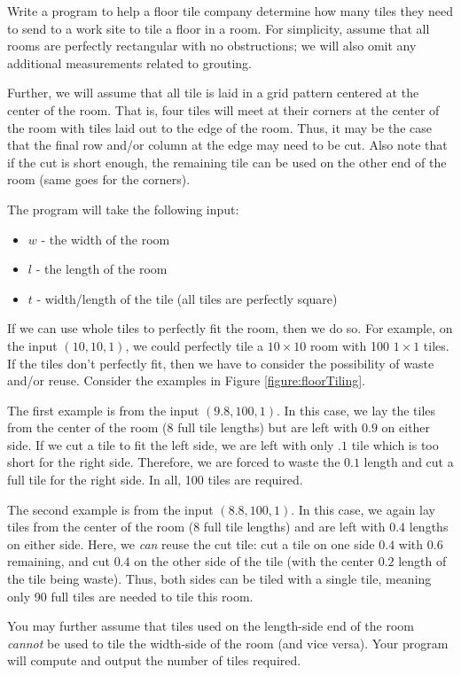 \begin{exer}
Write a program to  help a floor tile company determine how many
tiles they need to send to a work site to tile a floor in a room.  For 
simplicity, assume that all rooms are perfectly rectangular with no 
obstructions; we will also omit any additional measurements related 
to grouting.  

Further, we will assume that all tile is laid in a grid pattern centered 
at the center of the room.  That is, four tiles will meet at their corners 
at the center of the room with tiles laid out to the edge of the room.  
Thus, it may be the case that the final row and/or column at the edge 
may need to be cut.  Also note that if the cut is short enough, the 
remaining tile can be used on the other end of the room (same goes 
for the corners).

The program will take the following input:
\begin{itemize}
  \item $w$ - the width of the room
  \item $l$ - the length of the room
  \item $t$ - width/length of the tile (all tiles are perfectly square)
\end{itemize}

If we can use whole tiles to perfectly fit the room, then we do so.  
For example, on the input $(10, 10, 1)$, we could perfectly tile a 
$10 \times 10$ room with 100 $1 \times 1$ tiles.  If the tiles don't 
perfectly fit, then we have to consider the possibility of waste 
and/or reuse.  Consider the examples in Figure \ref{figure:floorTiling}.



The first example is from the input $(9.8, 100, 1)$.  In this case, 
we lay the tiles from the center of the room (8 full tile lengths) but 
are left with $0.9$ on either side.  If we cut a tile to fit the left
side, we are left with only $.1$ tile which is too short for the right 
side.  Therefore, we are forced to waste the $0.1$ length and cut 
a full tile for the right side.  In all, 100 tiles are required.

The second example is from the input $(8.8, 100, 1)$.  In this case, 
we again lay tiles from the center of the room (8 full tile lengths) and 
are left with $0.4$ lengths on either side.  Here, we \emph{can}
reuse the cut tile: cut a tile on one side $0.4$ with $0.6$ remaining, 
and cut $0.4$ on the other side of the tile (with the center $0.2$ 
length of the tile being waste).  Thus, both sides can be tiled with 
a single tile, meaning only 90 full tiles are needed to tile this room.

You may further assume that tiles used on 
the length-side end of the room \emph{cannot} be used to tile the 
width-side of the room (and vice versa).  Your program will compute 
and output the number of tiles required.
\end{exer}

